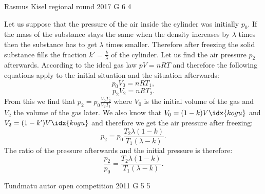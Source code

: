 \documentclass[11pt]{article}
\begin{document}
{Rasmus Kisel} %
{regional round} %
{2017} %
{G 6} %
{4} %
{

\ifEngSolution
Let us suppose that the pressure of the air inside the cylinder was initially $p_{0}$. If the mass of the substance stays the same when the density increases by $\lambda$ times then the substance has to get $\lambda$ times smaller. Therefore after freezing the solid substance fills the fraction $k'=\frac{k}{\lambda}$ of the cylinder. Let us find the air pressure $p_{2}$ afterwards. According to the ideal gas law $pV=nRT$ and therefore the following equations apply to the initial situation and the situation afterwards:
\begin{equation*}
p_{0}V_{0}=nRT_{1},
\end{equation*} 
\begin{equation*}
p_{2}V_{2}=nRT_{2}.
\end{equation*}
From this we find that $p_{2}=p_{0}\frac{V_{0}T_{2}}{V_{2}T_{1}}$ where $V_{0}$ is the initial volume of the gas and $V_{2}$ the volume of the gas later. We also know that $V_{0}=(1-k)V\idx{kogu}$ and $V_{2}=(1-k')V\idx{kogu}$ and therefore we get the air pressure after freezing:
\begin{equation*}
p_{2}=p_{0}\frac{T_{2}\lambda (1-k)}{T_{1}(\lambda-k)}.
\end{equation*} 
The ratio of the pressure afterwards and the initial pressure is therefore:
\begin{equation*}
\frac{p_{2}}{p_{0}}=\frac{T_{2}\lambda(1-k)}{T_{1}(\lambda-k)}.
\end{equation*}
\fi
}

\ylDisplay{} %
{Tundmatu autor} %
{open competition} %
{2011} %
{G 5} %
{5} %
{

\ifEngSolution
\fi
}
\end{document}
